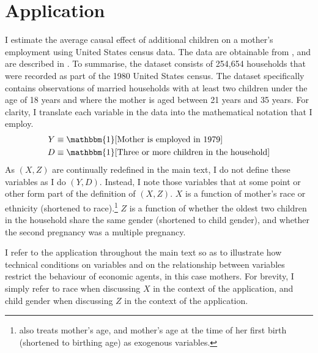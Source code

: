 \documentclass[12pt,a4paper,twoside]{article}
\newcommand{\US}{United States}
\numberwithin{equation}{section}
\begin{document}
\section*{Application}
I estimate the average causal effect of additional children on a mother's employment using {\US} census data. The data are obtainable from \cite{Angristdatabank}, and are described in \cite{ae98}. To summarise, the dataset consists of 254,654 households that were recorded as part of the 1980 {\US} census. The dataset specifically contains observations of married households with at least two children under the age of 18 years and where the mother is aged between 21 years and 35 years. For clarity, I translate each variable in the data into the mathematical notation that I employ.
\begin{align*}
Y&\equiv\mathbbm{1}[\text{Mother is employed in 1979}]\\
D&\equiv\mathbbm{1}[\text{Three or more children in the household}]
\end{align*}
As $(X,Z)$ are continually redefined in the main text, I do not define these variables as I do $(Y,D)$. Instead, I note those variables that at some point or other form part of the definition of $(X,Z)$. $X$ is a function of mother's race or ethnicity (shortened to race).\footnote{\cite{ae98} also treats mother's age, and mother's age at the time of her first birth (shortened to birthing age) as exogenous variables.} $Z$ is a function of whether the oldest two children in the household share the same gender (shortened to child gender), and whether the second pregnancy was a multiple pregnancy.

I refer to the application throughout the main text so as to illustrate how technical conditions on variables and on the relationship between variables restrict the behaviour of economic agents, in this case mothers. For brevity, I simply refer to race when discussing $X$ in the context of the application, and child gender when discussing $Z$ in the context of the application.
\end{document}
